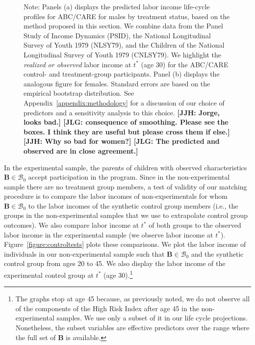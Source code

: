 \begin{figure}
\begin{subfigure}[h]{0.5\textwidth}
\end{subfigure}
\footnotesize \justify
Note: Panels (a) displays the predicted labor income life-cycle profiles for ABC/CARE for males by treatment status, based on the method proposed in this section. We combine data from the Panel Study of Income Dynamics (PSID), the National Longitudinal Survey of Youth 1979 (NLSY79), and the Children of the National Longitudinal Survey of Youth 1979 (CNLSY79). We highlight the \textit{realized or observed} labor income at $t^*$ (age 30) for the ABC/CARE control- and treatment-group participants. Panel (b) displays the analogous figure for females. Standard errors are based on the empirical bootstrap distribution.  See Appendix~\ref{appendix:methodology} for a discussion of our choice of predictors and a sensitivity analysis to this choice. \textbf{[JJH: Jorge, looks bad.] [JLG: consequence of smoothing. Please see the boxes. I think they are useful but please cross them if else.] [JJH: Why so bad for women?] [JLG: The predicted and observed are in close agreement.]}
\end{figure}

In the experimental sample, the parents of children with observed characteristics $\bm{B} \in \mathcal{B}_0$ accept participation in the program. Since in the non-experimental sample there are no treatment group members, a test of validity of our matching procedure is to compare the labor incomes of non-experimentals for whom $\bm{B} \in \mathcal{B}_0$ to the labor incomes of the synthetic control group members (i.e., the groups in the non-experimental samples that we use to extrapolate control group outcomes). We also compare labor income at $t^*$ of both groups to the observed labor income in the experimental sample (we observe labor income at $t^*$). Figure~\ref{figure:controltests} plots these comparisons. We plot the labor income of individuals in our non-experimental sample such that $\bm{B} \in \mathcal{B}_0$ and the synthetic control group from ages 20 to 45. We also display the labor income of the experimental control group at $t^*$ (age 30).\footnote{The graphs stop at age 45 because, as previously noted, we do not observe all of the components of the High Risk Index after age 45 in the non-experimental samples. We use only a subset of it in our life cycle projections. Nonetheless, the subset variables are effective predictors over the range where the full set of $\bm{B}$ is available.}


